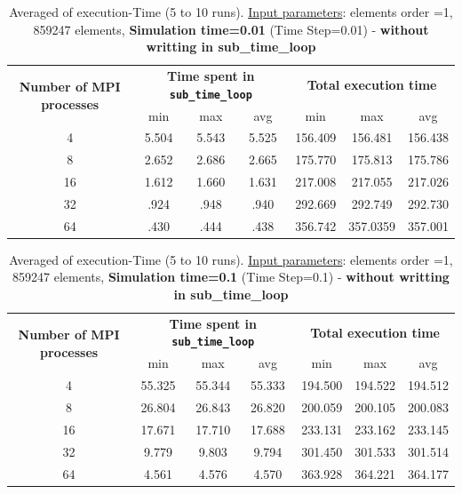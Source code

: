\documentclass[10pt,twoside]{article}   	%
\begin{document}
\begin{table}[ht!]
\centering
\caption{Averaged of execution-Time (5 to 10 runs). {\underline{Input parameters}}: elements order =1, 859247 elements,  {\bf{Simulation time=0.01}} (Time Step=0.01)  - {\bf{without writting in sub\_time\_loop}}}
{\small
\begin{tabular}{|c|c|c|c|c|c|c|} \hline 
\multirow{2}{*}{ {{\bf{Number of MPI processes}}} }	& \multicolumn{3}{c|}{ {{\bf{Time spent in \texttt{sub\_time\_loop}  }}} }	& \multicolumn{3}{c|}{  {{\bf{Total execution time}}} }\\ 
										&   		min & max & avg									& 	min & max & avg			\\ \hline \hline
 		4		                 				& 5.504 & 5.543 & 5.525										& 156.409 & 156.481 & 156.438 	\\ \hline
 		8		                 				& 2.652  &  2.686 &  2.665									&   175.770  &  175.813 &  175.786	\\ \hline
 		16		                 				&  1.612 & 1.660  & 1.631 									& 217.008 &  217.055 &  217.026	\\ \hline
		 32		                 				& .924 & .948   & .940										& 292.669  &  292.749 & 292.730	\\ \hline
		64		                 				& .430 & .444  & .438										&  356.742  & 357.0359 &  357.001	\\ \hline
\end{tabular}
}
\label{tab:2}
\end{table}


\begin{table}[ht!]
\centering
\caption{Averaged of execution-Time (5 to 10 runs). {\underline{Input parameters}}: elements order =1, 859247 elements,    {\bf{Simulation time=0.1}} (Time Step=0.1) - {\bf{without writting in sub\_time\_loop}}}
{\small
\begin{tabular}{|c|c|c|c|c|c|c|} \hline 
\multirow{2}{*}{ {{\bf{Number of MPI processes}}} }	& \multicolumn{3}{c|}{ {{\bf{Time spent in \texttt{sub\_time\_loop}  }}} }	& \multicolumn{3}{c|}{  {{\bf{Total execution time}}} }\\ 
										&   		min & max & avg									& 	min & max & avg			\\ \hline \hline
 		4		                 				& 55.325	& 55.344 & 55.333									&  194.500 & 194.522 & 194.512	\\ \hline
 		8		                 				& 26.804	& 26.843  & 26.820									&  200.059 & 200.105 & 200.083	\\ \hline
 		16		                 				&  17.671	&  17.710 & 17.688									&  233.131 & 233.162 &  233.145	\\ \hline
		 32		                 				& 9.779 & 9.803  & 9.794										&  301.450 & 301.533 & 301.514	\\ \hline
		64		                 				& 4.561 & 4.576  & 4.570										&  363.928 & 364.221 & 364.177	\\ \hline
\end{tabular}
}
\label{tab:3}
\end{table}
\end{document}
